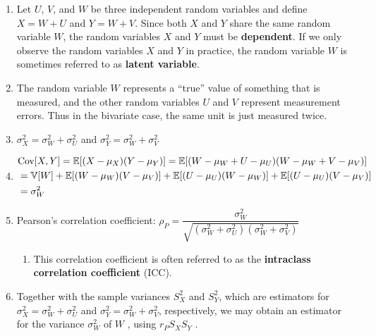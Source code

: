 \begin{enumerate}
    \item Let $U$, $V$, and $W$ be three independent random variables and define $X = W + U$ and $Y = W + V$.
    Since both $X$ and $Y$ share the same random variable $W$, the random variables $X$ and $Y$ must be \textbf{dependent}.
    If we only observe the random variables $X$ and $Y$ in practice, the random variable $W$ is sometimes referred to as \textbf{latent variable}.
    \hfill \cite{statistics/book/Statistics-for-Data-Scientists/Maurits-Kaptein}

    \item The random variable $W$ represents a “true” value of something that is measured, and the other random variables $U$ and $V$ represent measurement errors.
    Thus in the bivariate case, the same unit is just measured twice.
    \hfill \cite{statistics/book/Statistics-for-Data-Scientists/Maurits-Kaptein}

    \item $\sigma^2_X = \sigma^2_W + \sigma^2_U$ and $\sigma^2_Y = \sigma^2_W + \sigma^2_V$
    \hfill \cite{statistics/book/Statistics-for-Data-Scientists/Maurits-Kaptein}

    \item
    $
        \begin{aligned}
            &\text{Cov}[X, Y]
            = \mathbb{E}[(X - \mu_X )(Y - \mu_Y )]
            = \mathbb{E}[(W - \mu_W + U - \mu_U )(W - \mu_W + V - \mu_V )] \\
            &= \mathbb{V}[W] + \mathbb{E}[(W - \mu_W )(V - \mu_V )] + \mathbb{E}[(U - \mu_U )(W - \mu_W )] + \mathbb{E}[(U - \mu_U )(V - \mu_V )] \\
            &= \sigma^2_W
        \end{aligned}
    $
    \hfill \cite{statistics/book/Statistics-for-Data-Scientists/Maurits-Kaptein}

    \item Pearson’s correlation coefficient:
    $
        \rho_P
        = \dfrac{\sigma^2_W }{\sqrt{(\sigma^2_W + \sigma^2_U )(\sigma^2_W + \sigma^2_V )}}
    $
    \hfill \cite{statistics/book/Statistics-for-Data-Scientists/Maurits-Kaptein}
    \begin{enumerate}
        \item This correlation coefficient is often referred to as the \textbf{intraclass correlation coefficient} (ICC).
        \hfill \cite{statistics/book/Statistics-for-Data-Scientists/Maurits-Kaptein}
    \end{enumerate}

    \item Together with the sample variances $S^2_X$ and $S^2_Y $, which are estimators for $\sigma^2_X = \sigma^2_W + \sigma^2_U$ and $\sigma^2_Y = \sigma^2_W + \sigma^2_V $, respectively, we may obtain an estimator for the variance $\sigma^2_W$ of $W$ , using $r_P S_X S_Y$ .
    \hfill \cite{statistics/book/Statistics-for-Data-Scientists/Maurits-Kaptein}
\end{enumerate}


